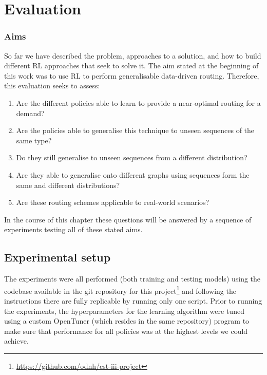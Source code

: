 \chapter{Evaluation}
\label{chapter:evaluation}

\subsection{Aims}
So far we have described the problem, approaches to a solution, and how to build different RL approaches that seek to solve it. The aim stated at the beginning of this work was to use RL to perform generalisable data-driven routing. Therefore, this evaluation seeks to assess:

\begin{enumerate}
\item Are the different policies able to learn to provide a near-optimal routing for a demand?
\item Are the policies able to generalise this technique to unseen sequences of the same type?
\item Do they still generalise to unseen sequences from a different distribution?
\item Are they able to generalise onto different graphs using sequences form the same and different distributions?
\item Are these routing schemes applicable to real-world scenarios?
\end{enumerate}

In the course of this chapter these questions will be answered by a sequence of experiments testing all of these stated aims.



\section{Experimental setup}
The experiments were all performed (both training and testing models) using the codebase available in the git repository for this project\footnote{\url{https://github.com/odnh/cst-iii-project}} and following the instructions there are fully replicable by running only one script. Prior to running the experiments, the hyperparameters for the learning algorithm were tuned using a custom OpenTuner\cite{ansel2014opentuner} (which resides in the same repository) program to make sure that performance for all policies was at the highest levels we could achieve.

